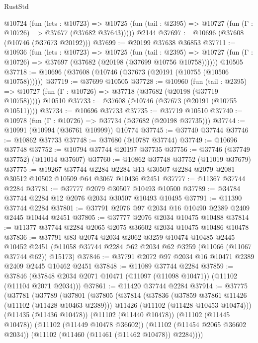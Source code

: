 \begin{lexlean}{RustStd}
\begin{coremodule}
    @10724
      (fun (lets : @10723) =>
      @10725 (fun (tail : @2395) => @10727 (fun (Γ : @10726) => @37677 (@37682 @37643)))))
    @2144
@37697 := @10696 (@37608 (@10746 (@37673 @20192)))
@37699 := @20199 @37638 @36853
@37711 := @10936
    (fun (lets : @10723) =>
    @10725
      (fun (tail : @2395) =>
      @10727 (fun (Γ : @10726) => @37697 (@37682 (@20198 (@37699 @10756 @10758))))))
    @10505
@37718 := @10696 (@37608 (@10746 (@37673 (@20191 (@10755 (@10506 @10758))))))
@37719 := @37699 @10505
@37728 := @10960
    (fun (tail : @2395) => @10727 (fun (Γ : @10726) => @37718 (@37682 (@20198 (@37719 @10758)))))
    @10510
@37733 := @37608 (@10746 (@37673 (@20191 (@10755 @10511))))
@37734 := @10696 @37733
@37735 := @37719 @10510
@37740 := @10978 (fun (Γ : @10726) => @37734 (@37682 (@20198 @37735)))
@37744 := @10991 (@10994 (@36761 @10999)) @10774
@37745 := @37740 @37744
@37746 := @10862 @37733
@37748 := @37680 (@10787 @37744)
@37749 := @10696 @37748
@37752 := @10794 @37744 @20197 @37735
@37756 := @37746 (@37749 @37752) (@11014 @37607)
@37760 := @10862 @37748 @37752 (@11019 @37679)
@37775 := @19267
    @37744
    @2284
    @2284
    @13
    @30507
    @2284
    @2079
    @2081
    @30512
    @10502
    @10509
    @64
    @3067
    @10436
    @2451
@37777 := @11367 @37744 @2284
@37781 := @37777 @2079 @30507 @10493 @10500
@37789 := @34784 @37744 @2284 @12 @2076 @2034 @30507 @10493 @10495
@37791 := @11390 @37744 @2284
@37801 := @37791 @2076 @97 @2034 @16 @10490 @2389 @2409 @2445 @10444 @2451
@37805 := @37777 @2076 @2034 @10475 @10488
@37814 := @11377 @37744 @2284 @2065 @2075 @36602 @2034 @10475 @10486 @10478
@37836 := @37791
    @83
    @2074
    @2034
    @2062
    @3259
    @10474
    @10485
    @2445
    @10452
    @2451
    (@11058 @37744 @2284 @62 @2034 @62 @3259 (@11066 (@11067 @37744 @62)) @15173)
@37846 := @37791 @2072 @97 @2034 @16 @10471 @2389 @2409 @2445 @10462 @2451
@37848 := @11089 @37744 @2284
@37859 := @37846 (@37848 @2034 @2071 @10471 (@11097 (@11098 @10471)) (@11102 (@11104 @2071 @2034)))
@37861 := @11420 @37744 @2284
@37914 := @37775
    (@37781
      (@37789
        (@37801
          (@37805
            (@37814
              (@37836
                (@37859 @37861 @11426 (@11102 (@11428 @10463 @2389)))
                @11426
                (@11102 (@11428 @10453 @10474)))
              (@11435 (@11436 @10478))
              (@11102 (@11440 @10478))
              (@11102 (@11445 @10478))
              (@11102 (@11449 @10478 @36602))
              (@11102 (@11454 @2065 @36602 @2034))
              (@11102 (@11460 (@11461 (@11462 @10478)) @2284))))

\end{coremodule}
\end{lexlean}
